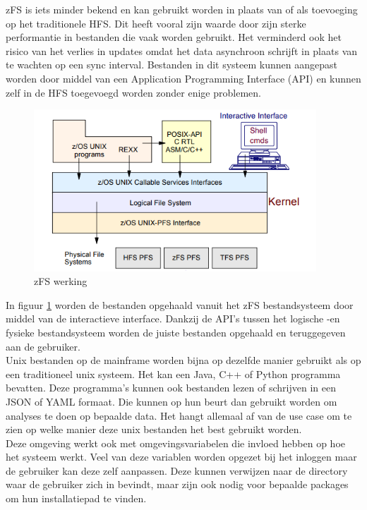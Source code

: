 zFS is iets minder bekend en kan gebruikt worden in plaats van of als toevoeging op het traditionele HFS. Dit heeft vooral zijn waarde door zijn sterke performantie in bestanden die vaak worden gebruikt. Het verminderd ook het risico van het verlies in updates omdat het data asynchroon schrijft in plaats van te wachten op een sync interval. Bestanden in dit systeem kunnen aangepast worden door middel van een Application Programming Interface (API) en kunnen zelf in de HFS toegevoegd worden zonder enige problemen. \autocite{IBM2012} \\

\begin{figure}[pt!]
    \centering
    \includegraphics[width=300pt]{./graphics/zFS.png}
    \caption{zFS werking \autocite{IBM2012}}
    \label{fig:zFS}
\end{figure}

In figuur \ref{fig:zFS} worden de bestanden opgehaald vanuit het zFS bestandsysteem door middel van de interactieve interface. Dankzij de API's tussen het logische -en fysieke bestandsysteem worden de juiste bestanden opgehaald en teruggegeven aan de gebruiker. \autocite{IBM2012} \\

Unix bestanden op de mainframe worden bijna op dezelfde manier gebruikt als op een traditioneel unix systeem. Het kan een Java, C++ of Python programma bevatten. Deze programma's kunnen ook bestanden lezen of schrijven in een JSON of YAML formaat. Die kunnen op hun beurt dan gebruikt worden om analyses te doen op bepaalde data. Het hangt allemaal af van de use case om te zien op welke manier deze unix bestanden het best gebruikt worden. \autocite{Precisely2020} \\

Deze omgeving werkt ook met omgevingsvariabelen die invloed hebben op hoe het systeem werkt. Veel van deze variablen worden opgezet bij het inloggen maar de gebruiker kan deze zelf aanpassen. Deze kunnen verwijzen naar de directory waar de gebruiker zich in bevindt, maar zijn ook nodig voor bepaalde packages om hun installatiepad te vinden. \autocite{HenryStocker2017}

